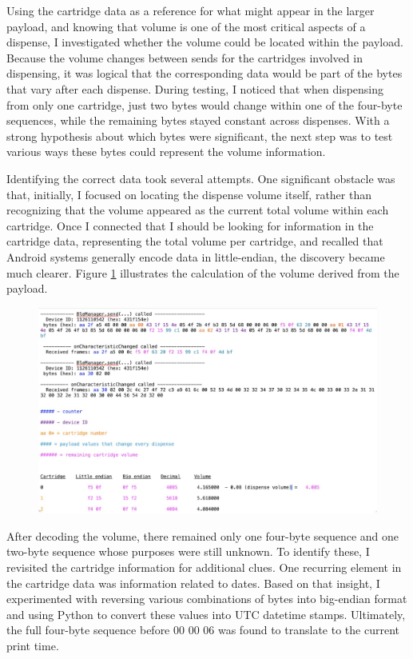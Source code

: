 Using the cartridge data as a reference for what might appear in the larger payload, and knowing that volume is one of the most critical aspects of a dispense, I investigated whether the volume could be located within the payload. Because the volume changes between sends for the cartridges involved in dispensing, it was logical that the corresponding data would be part of the bytes that vary after each dispense. During testing, I noticed that when dispensing from only one cartridge, just two bytes would change within one of the four-byte sequences, while the remaining bytes stayed constant across dispenses. With a strong hypothesis about which bytes were significant, the next step was to test various ways these bytes could represent the volume information.

Identifying the correct data took several attempts. One significant obstacle was that, initially, I focused on locating the dispense volume itself, rather than recognizing that the volume 
appeared as the current total volume within each cartridge. Once I connected that I should be looking for information in the cartridge data, representing the total volume per cartridge, and recalled that Android systems generally encode data in little-endian, the discovery became much clearer. Figure \ref*{fig:payload5} illustrates the calculation of the volume derived from the payload.

\begin{figure}[H]
	\centering
	\includegraphics[width=0.7\linewidth]{payload5}
	\caption{}
	\label{fig:payload5}
\end{figure}

After decoding the volume, there remained only one four-byte sequence and one two-byte sequence whose purposes were still unknown. To identify these, I revisited the cartridge information for additional clues. One recurring element in the cartridge data was information related to dates. Based on that insight, I experimented with reversing various combinations of bytes into big-endian format and using Python to convert these values into UTC datetime stamps. Ultimately, the full four-byte sequence before 00 00 06 was found to translate to the current print time.

